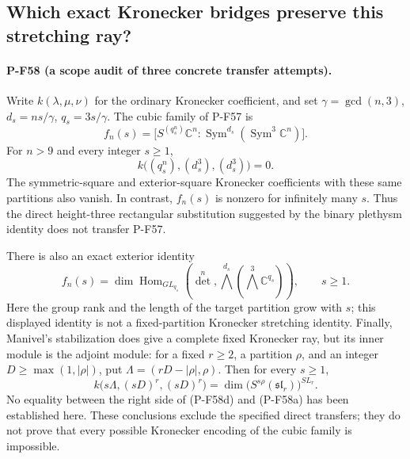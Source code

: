 \subsection{Which exact Kronecker bridges preserve this stretching ray?}
\label{sec:kronecker-bridge-audit}

\paragraph{P-F58 (a scope audit of three concrete transfer attempts).}
Write $k(\lambda,\mu,\nu)$ for the ordinary Kronecker coefficient,
and set $\gamma=\gcd(n,3)$, $d_s=ns/\gamma$,
$q_s=3s/\gamma$.  The cubic family of P-F57 is
\[
 f_n(s)=\bigl[S^{(q_s^n)}\mathbb C^n:
                    \operatorname{Sym}^{d_s}
                         (\operatorname{Sym}^3\mathbb C^n)\bigr].
                                                        \tag{P-F58a}
\]
For $n>9$ and every integer $s\ge1$,
\[
 k\bigl((q_s^n),(d_s^3),(d_s^3)\bigr)=0.                \tag{P-F58b}
\]
The symmetric-square and exterior-square Kronecker coefficients
with these same partitions also vanish.  In contrast, $f_n(s)$
is nonzero for infinitely many $s$.  Thus the direct
height-three rectangular substitution suggested by the binary
plethysm identity does not transfer P-F57.

There is also an exact exterior identity
\[
 f_n(s)=\dim\operatorname{Hom}_{GL_{q_s}}
 \left(\det^n,
       \bigwedge^{d_s}(\bigwedge^3\mathbb C^{q_s})\right),
 \qquad s\ge1.                                        \tag{P-F58c}
\]
Here the group rank and the length of the target partition grow
with $s$; this displayed identity is not a fixed-partition
Kronecker stretching identity.  Finally, Manivel's stabilization
does give a complete fixed Kronecker ray, but its inner module
is the adjoint module: for a fixed $r\ge2$, a partition $\rho$,
and an integer $D\ge\max(1,|\rho|)$, put
$\Lambda=(rD-|\rho|,\rho)$.  Then for every $s\ge1$,
\[
 k\bigl(s\Lambda,(sD)^r,(sD)^r\bigr)
       =\dim\bigl(S^{s\rho}(\mathfrak{sl}_r)\bigr)^{SL_r}.
                                                        \tag{P-F58d}
\]
No equality between the right side of (P-F58d) and (P-F58a)
has been established here.  These conclusions exclude the
specified direct transfers; they do not prove that every
possible Kronecker encoding of the cubic family is impossible.

